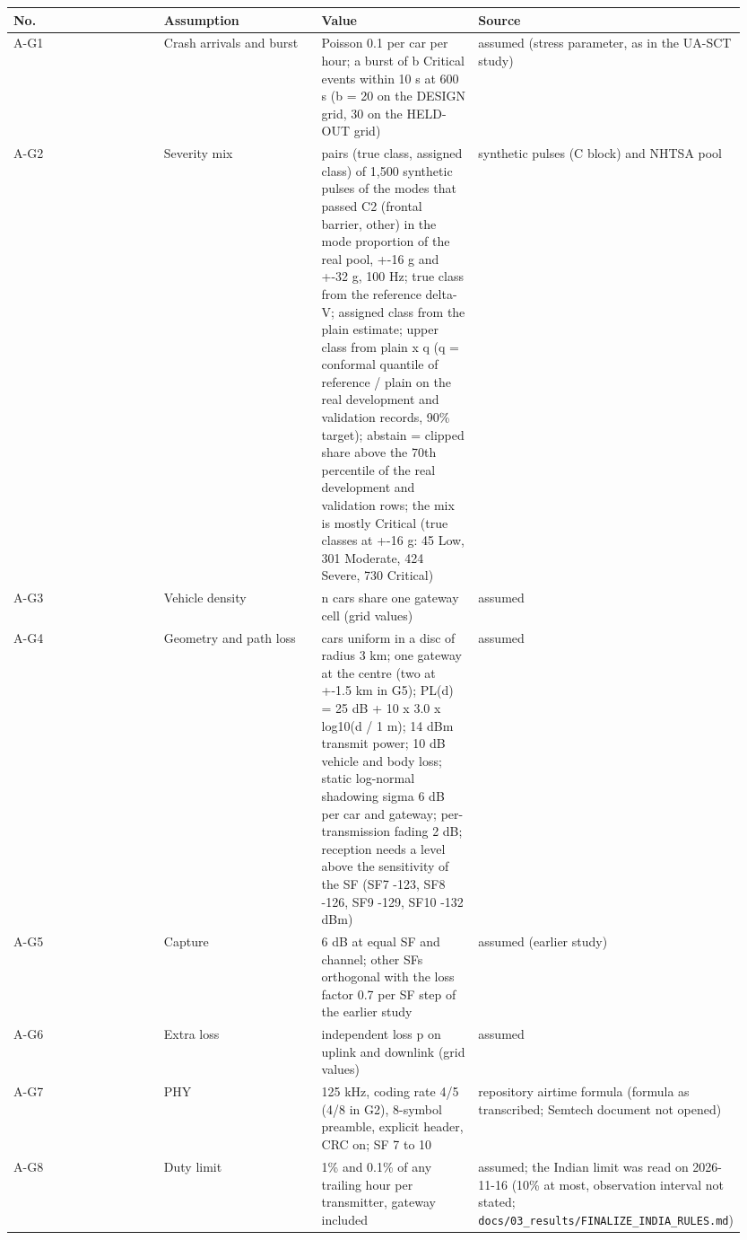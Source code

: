{\scriptsize\raggedright
\begin{longtable}{p{0.237\linewidth}p{0.237\linewidth}p{0.237\linewidth}p{0.237\linewidth}}
\toprule
No. & Assumption & Value & Source \\
\midrule
\endhead
A-G1 & Crash arrivals and burst & Poisson 0.1 per car per hour; a burst of b Critical events within 10 s at 600 s (b = 20 on the DESIGN grid, 30 on the HELD-OUT grid) & assumed (stress parameter, as in the UA-SCT study) \\
A-G2 & Severity mix & pairs (true class, assigned class) of 1,500 synthetic pulses of the modes that passed C2 (frontal barrier, other) in the mode proportion of the real pool, +-16 g and +-32 g, 100 Hz; true class from the reference delta-V; assigned class from the plain estimate; upper class from plain x q (q = conformal quantile of reference / plain on the real development and validation records, 90\% target); abstain = clipped share above the 70th percentile of the real development and validation rows; the mix is mostly Critical (true classes at +-16 g: 45 Low, 301 Moderate, 424 Severe, 730 Critical) & synthetic pulses (C block) and NHTSA pool \\
A-G3 & Vehicle density & n cars share one gateway cell (grid values) & assumed \\
A-G4 & Geometry and path loss & cars uniform in a disc of radius 3 km; one gateway at the centre (two at +-1.5 km in G5); PL(d) = 25 dB + 10 x 3.0 x log10(d / 1 m); 14 dBm transmit power; 10 dB vehicle and body loss; static log-normal shadowing sigma 6 dB per car and gateway; per-transmission fading 2 dB; reception needs a level above the sensitivity of the SF (SF7 -123, SF8 -126, SF9 -129, SF10 -132 dBm) & assumed \\
A-G5 & Capture & 6 dB at equal SF and channel; other SFs orthogonal with the loss factor 0.7 per SF step of the earlier study & assumed (earlier study) \\
A-G6 & Extra loss & independent loss p on uplink and downlink (grid values) & assumed \\
A-G7 & PHY & 125 kHz, coding rate 4/5 (4/8 in G2), 8-symbol preamble, explicit header, CRC on; SF 7 to 10 & repository airtime formula (formula as transcribed; Semtech document not opened) \\
A-G8 & Duty limit & 1\% and 0.1\% of any trailing hour per transmitter, gateway included & assumed; the Indian limit was read on 2026-11-16 (10\% at most, observation interval not stated; \texttt{docs/03\_results/FINALIZE\_INDIA\_RULES.md}) \\

\end{longtable}}
